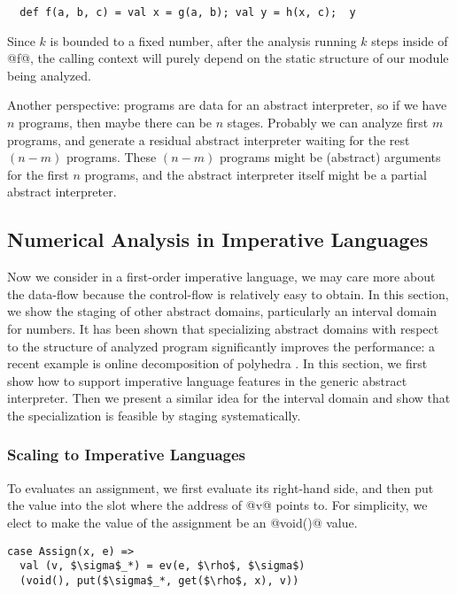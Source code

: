 \begin{lstlisting}
  def f(a, b, c) = val x = g(a, b); val y = h(x, c);  y
\end{lstlisting}

Since $k$ is bounded to a fixed number, after the analysis running $k$ steps
inside of @f@, the calling context will purely depend on the static structure of
our module being analyzed.

\iffalse
Another perspective: programs are data for an abstract interpreter, so if we
have $n$ programs, then maybe there can be $n$ stages. Probably we can analyze
first $m$ programs, and generate a residual abstract interpreter waiting for the
rest $(n-m)$ programs. These $(n-m)$ programs might be (abstract) arguments for
the first $n$ programs, and the abstract interpreter itself might be a partial
abstract interpreter.

\subsection{Numerical Analysis in Imperative Languages} \label{cases_imp}

Now we consider in a first-order imperative language, we may care more about the
data-flow because the control-flow is relatively easy to obtain. In this
section, we show the staging of other abstract domains, particularly an interval
domain for numbers. It has been shown that specializing abstract domains with
respect to the structure of analyzed program significantly improves the
performance: a recent example is online decomposition of polyhedra
\cite{DBLP:conf/popl/SinghPV17, Singh:2017:PCD:3177123.3158143}. In this
section, we first show how to support imperative language features in the
generic abstract interpreter. Then we present a similar idea for the interval
domain and show that the specialization is feasible by staging systematically.

\subsubsection{Scaling to Imperative Languages}

To evaluates an assignment, we first evaluate its right-hand side, and then put
the value into the slot where the address of @v@ points to. For simplicity, we
elect to make the value of the assignment be an @void()@ value.

\begin{lstlisting}
case Assign(x, e) =>
  val (v, $\sigma$_*) = ev(e, $\rho$, $\sigma$)
  (void(), put($\sigma$_*, get($\rho$, x), v))
\end{lstlisting}

